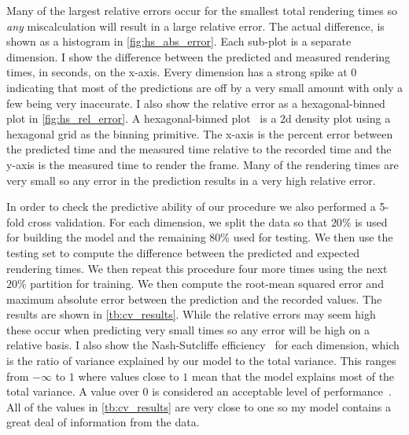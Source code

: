 Many of the largest relative errors occur for the smallest total rendering
times so \emph{any} miscalculation will result in a large relative error.  The
actual difference, is shown as a histogram in \autoref{fig:hs_abs_error}.  Each
sub-plot is a separate dimension.  I show the difference between the
predicted and measured rendering times, in seconds, on the x-axis.  Every
dimension has a strong spike at $0$ indicating that most of the predictions
are off by a very small amount with only a few being very inaccurate.  I also
show the relative error as a hexagonal-binned plot in \autoref{fig:hs_rel_error}.
A hexagonal-binned plot~\cite{Carr:1987} is a $2$d density plot using a
hexagonal grid as the binning primitive.  The x-axis is the percent error
between the predicted time and the measured time relative to the recorded time
and the y-axis is the measured time to render the frame.  Many of the
rendering times are very small so any error in the prediction results in a
very high relative error.

In order to check the predictive ability of our procedure we also performed a 
5-fold cross validation.  For each dimension, we split the data so that
$20\%$ is used for building the model and the remaining $80\%$ used for 
testing.  We then use the testing set to compute the difference between the 
predicted and expected rendering times.  We then repeat this procedure four
more times using the next $20\%$ partition for training.  We then compute
the root-mean squared error and maximum absolute
error between the prediction and the recorded values.  The results are 
shown in \autoref{tb:cv_results}.  While the relative errors may
seem high these occur when predicting very small
times so any error will be high on a relative basis.
I also show the
Nash-Sutcliffe efficiency~\cite{Nash:1970} for each dimension, which is the 
ratio of variance explained by our model to the total variance.  This ranges
from $-\infty$ to $1$ where values close to $1$ mean that the model explains 
most of the total variance.  A value over $0$ is considered an acceptable
level of performance~\cite{Moriasi:2007}.
All of the values in \autoref{tb:cv_results} are 
very close to one so my model contains a great deal of information from
the data.

\begin{table}[htb]
\centering
  \caption[Results of the cross-validation procedure.]{%
  Results of the cross-validation procedure.  For each dimension I compute
  the root-mean squared error of prediction as well as the Nash-Sutcliffe
  efficiency~\cite{Nash:1970}, and the relative maximum error.  The 
  Nash-Sutcliffe
  efficiency is the ratio of the variance explained by our prediction
  model to the total variance.
  All errors are in terms of seconds.
  }

\label{tb:cv_results}
\end{table}


